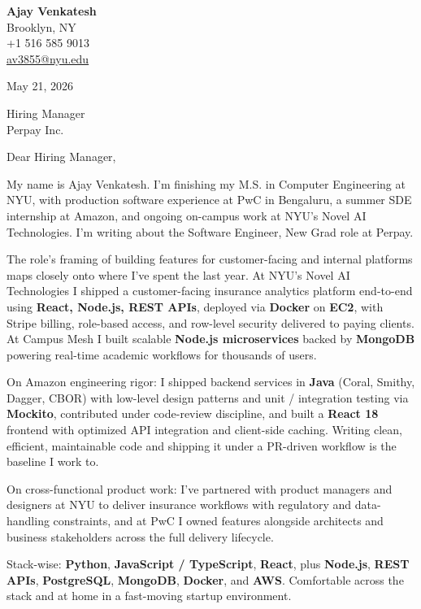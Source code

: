 \documentclass[letterpaper,11pt]{article}
\begin{document}
\begin{flushleft}
\textbf{\large Ajay Venkatesh} \\
Brooklyn, NY \\
+1 516 585 9013 \\
\href{mailto:av3855@nyu.edu}{av3855@nyu.edu}
\end{flushleft}
\vspace{10pt}
May 21, 2026
\vspace{6pt}

Hiring Manager \\
Perpay Inc.

\vspace{10pt}

Dear Hiring Manager,

My name is Ajay Venkatesh. I'm finishing my M.S. in Computer Engineering at NYU, with production software experience at PwC in Bengaluru, a summer SDE internship at Amazon, and ongoing on-campus work at NYU's Novel AI Technologies. I'm writing about the Software Engineer, New Grad role at Perpay.

The role's framing of building features for customer-facing and internal platforms maps closely onto where I've spent the last year. At NYU's Novel AI Technologies I shipped a customer-facing insurance analytics platform end-to-end using \textbf{React, Node.js, REST APIs}, deployed via \textbf{Docker} on \textbf{EC2}, with Stripe billing, role-based access, and row-level security delivered to paying clients. At Campus Mesh I built scalable \textbf{Node.js microservices} backed by \textbf{MongoDB} powering real-time academic workflows for thousands of users.

On Amazon engineering rigor: I shipped backend services in \textbf{Java} (Coral, Smithy, Dagger, CBOR) with low-level design patterns and unit / integration testing via \textbf{Mockito}, contributed under code-review discipline, and built a \textbf{React 18} frontend with optimized API integration and client-side caching. Writing clean, efficient, maintainable code and shipping it under a PR-driven workflow is the baseline I work to.

On cross-functional product work: I've partnered with product managers and designers at NYU to deliver insurance workflows with regulatory and data-handling constraints, and at PwC I owned features alongside architects and business stakeholders across the full delivery lifecycle.

Stack-wise: \textbf{Python}, \textbf{JavaScript / TypeScript}, \textbf{React}, plus \textbf{Node.js}, \textbf{REST APIs}, \textbf{PostgreSQL}, \textbf{MongoDB}, \textbf{Docker}, and \textbf{AWS}. Comfortable across the stack and at home in a fast-moving startup environment.
\end{document}
